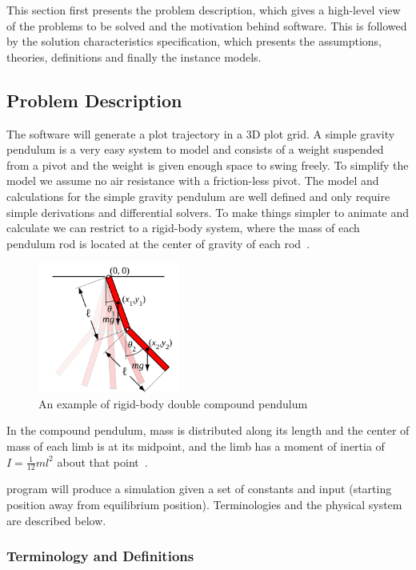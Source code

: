 \documentclass[12pt, titlepage]{article}
\begin{document}
This section first presents the problem description, which gives a high-level
view of the problems to be solved and the motivation behind \progname software.
This is followed by the solution
characteristics specification, which presents the assumptions, theories, 
definitions and finally the instance models.

\subsection{Problem Description}

The \progname software will generate a plot trajectory in a 3D plot grid.
A simple gravity pendulum is a very easy system to model and consists of a
weight suspended from a pivot and the weight is given enough space to swing
freely. To simplify the model we assume no air resistance with a friction-less
pivot. The model and calculations for the simple gravity pendulum are well
defined and only require simple derivations and differential solvers. 
To make things simpler to animate and calculate we can restrict to a rigid-body 
system, where the mass 
of each pendulum rod is located at the center of gravity of each 
rod~\cite{DoublePendulum}.

\begin{figure}[!htb]
	\centering
	\includegraphics[width=175px]{Double-pendulum-rigid.png}
	\caption{An example of rigid-body double compound 
	pendulum~\citep{DoublePendulum}}
	\label{fig:multipend}
\end{figure}

In the compound pendulum, mass is distributed along its length and the center 
of mass of each limb is at its midpoint, and the limb has a moment of inertia 
of $I = \frac{1}{12}ml^2$ about that point~\cite{DoublePendulum}.

\progname program will produce a simulation given a set of constants and input 
(starting position away from equilibrium position).
Terminologies and the physical system are described below.

\subsubsection{Terminology and Definitions}
\end{document}

